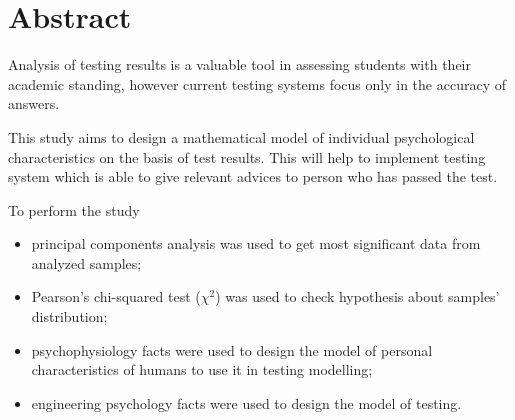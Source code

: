 \chapter*{Abstract}

Analysis of testing results is a valuable tool in assessing students
with their academic standing, however current testing systems focus
only in the accuracy of answers.

This study aims to design a mathematical model of individual
psychological characteristics on the basis of test results.
This will help to implement testing system which is able
to give relevant advices to person who has passed the test.

To perform the study
\begin{itemize}
  \item 
    principal components analysis was used
    to get most significant data from analyzed samples;
  \item
    Pearson's chi-squared test ($\chi^2$) was used to check
    hypothesis about samples' distribution;
  \item
    psychophysiology facts were used to design the model of personal
    characteristics of humans to use it in testing modelling;
  \item
    engineering psychology facts were used to design the model of testing.
\end{itemize}
